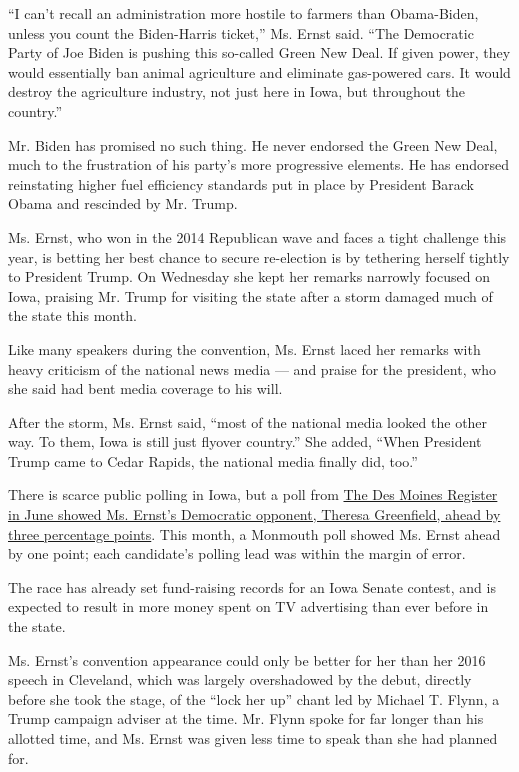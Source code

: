 ``I can't recall an administration more hostile to farmers than
Obama-Biden, unless you count the Biden-Harris ticket,'' Ms. Ernst said.
``The Democratic Party of Joe Biden is pushing this so-called Green New
Deal. If given power, they would essentially ban animal agriculture and
eliminate gas-powered cars. It would destroy the agriculture industry,
not just here in Iowa, but throughout the country.''

Mr. Biden has promised no such thing. He never endorsed the Green New
Deal, much to the frustration of his party's more progressive elements.
He has endorsed reinstating higher fuel efficiency standards put in
place by President Barack Obama and rescinded by Mr. Trump.

Ms. Ernst, who won in the 2014 Republican wave and faces a tight
challenge this year, is betting her best chance to secure re-election is
by tethering herself tightly to President Trump. On Wednesday she kept
her remarks narrowly focused on Iowa, praising Mr. Trump for visiting
the state after a storm damaged much of the state this month.

Like many speakers during the convention, Ms. Ernst laced her remarks
with heavy criticism of the national news media --- and praise for the
president, who she said had bent media coverage to his will.

After the storm, Ms. Ernst said, ``most of the national media looked the
other way. To them, Iowa is still just flyover country.'' She added,
``When President Trump came to Cedar Rapids, the national media finally
did, too.''

There is scarce public polling in Iowa, but a poll from
\href{https://www.nytimes3xbfgragh.onion/2020/06/20/us/politics/iowa-polls-trump-biden-ernst-greenfield.html}{The
Des Moines Register in June showed Ms. Ernst's Democratic opponent,
Theresa Greenfield, ahead by three percentage points}. This month, a
Monmouth poll showed Ms. Ernst ahead by one point; each candidate's
polling lead was within the margin of error.

The race has already set fund-raising records for an Iowa Senate
contest, and is expected to result in more money spent on TV advertising
than ever before in the state.

Ms. Ernst's convention appearance could only be better for her than her
2016 speech in Cleveland, which was largely overshadowed by the debut,
directly before she took the stage, of the ``lock her up'' chant led by
Michael T. Flynn, a Trump campaign adviser at the time. Mr. Flynn spoke
for far longer than his allotted time, and Ms. Ernst was given less time
to speak than she had planned for.

